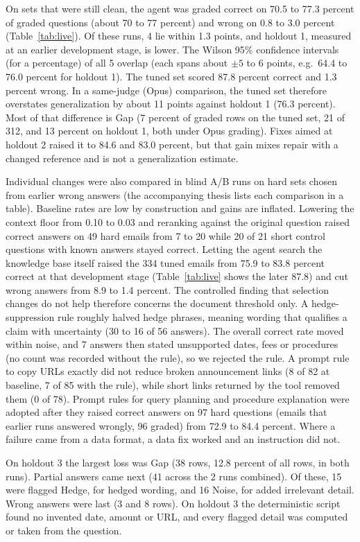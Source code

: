 \documentclass[a4paper,10pt,twocolumn]{article}
\begin{document}
On sets that were still clean, the agent was graded correct on 70.5 to 77.3 percent of graded questions (about 70 to 77 percent) and wrong on 0.8 to 3.0 percent (Table~\ref{tab:live}). Of these runs, 4 lie within 1.3 points, and holdout 1, measured at an earlier development stage, is lower. The Wilson 95\% confidence intervals (for a percentage) of all 5 overlap (each spans about $\pm5$ to 6 points, e.g.\ 64.4 to 76.0 percent for holdout 1). The tuned set scored 87.8 percent correct and 1.3 percent wrong. In a same-judge (Opus) comparison, the tuned set therefore overstates generalization by about 11 points against holdout 1 (76.3 percent). Most of that difference is Gap (7 percent of graded rows on the tuned set, 21 of 312, and 13 percent on holdout 1, both under Opus grading). Fixes aimed at holdout 2 raised it to 84.6 and 83.0 percent, but that gain mixes repair with a changed reference and is not a generalization estimate.

Individual changes were also compared in blind A/B runs on hard sets chosen from earlier wrong answers (the accompanying thesis lists each comparison in a table). Baseline rates are low by construction and gains are inflated. Lowering the context floor from 0.10 to 0.03 and reranking against the original question raised correct answers on 49 hard emails from 7 to 20 while 20 of 21 short control questions with known answers stayed correct. Letting the agent search the knowledge base itself raised the 334 tuned emails from 75.9 to 83.8 percent correct at that development stage (Table~\ref{tab:live} shows the later 87.8) and cut wrong answers from 8.9 to 1.4 percent. The controlled finding that selection changes do not help therefore concerns the document threshold only. A hedge-suppression rule roughly halved hedge phrases, meaning wording that qualifies a claim with uncertainty (30 to 16 of 56 answers). The overall correct rate moved within noise, and 7 answers then stated unsupported dates, fees or procedures (no count was recorded without the rule), so we rejected the rule. A prompt rule to copy URLs exactly did not reduce broken announcement links (8 of 82 at baseline, 7 of 85 with the rule), while short links returned by the tool removed them (0 of 78). Prompt rules for query planning and procedure explanation were adopted after they raised correct answers on 97 hard questions (emails that earlier runs answered wrongly, 96 graded) from 72.9 to 84.4 percent. Where a failure came from a data format, a data fix worked and an instruction did not.

On holdout 3 the largest loss was Gap (38 rows, 12.8 percent of all rows, in both runs). Partial answers came next (41 across the 2 runs combined). Of these, 15 were flagged Hedge, for hedged wording, and 16 Noise, for added irrelevant detail. Wrong answers were last (3 and 8 rows). On holdout 3 the deterministic script found no invented date, amount or URL, and every flagged detail was computed or taken from the question.
\end{document}
